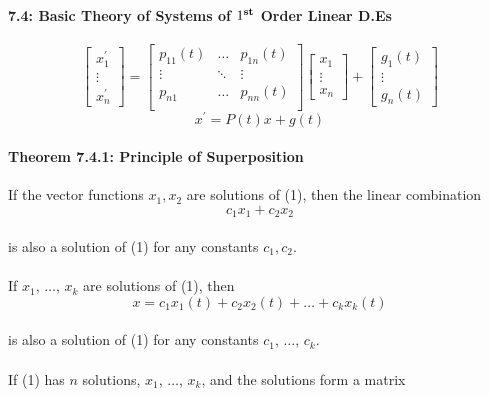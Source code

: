 \documentclass[letterpaper,12pt]{article}
\begin{document}
\paragraph{7.4: Basic Theory of Systems of $1^{\text{\textbf{st}}}$ Order Linear D.Es}

\[
    \begin{bmatrix}
        x_1^{\prime}\\ \vdots \\ x_n^{\prime}
    \end{bmatrix}
    = 
    \begin{bmatrix}
        p_{11}(t) & \ldots & p_{1n}(t)\\
        \vdots & \ddots & \vdots\\
        p_{n1} & \ldots & p_{nn}(t)\\
    \end{bmatrix}
    \begin{bmatrix}
        x_1 \\ \vdots \\ x_n
    \end{bmatrix}
    +
    \begin{bmatrix}
        g_1(t)\\ \vdots \\ g_n(t)
    \end{bmatrix}
\]
\begin{equation}
    x^{\prime} = P(t)x + g(t)
\end{equation}
\paragraph{Theorem 7.4.1: Principle of Superposition}If the vector functions
$x_1, x_2$ are solutions of (1), then the linear combination
\[
    c_1x_1 + c_2x_2
\]
\paragraph{}is also a solution of (1) for any constants $c_1, c_2$.
\paragraph{}If $x_1$, $\ldots$, $x_k$ are solutions of (1), then 
\[
    x = c_1x_1(t) + c_2x_2(t) + \ldots + c_kx_k(t)
\]
\paragraph{}is also a solution of (1) for any constants $c_1$, $\ldots$, $c_k$.
\paragraph{}If (1) has $n$ solutions, $x_1$, $\ldots$, $x_k$, and the solutions
form a matrix
\end{document}
